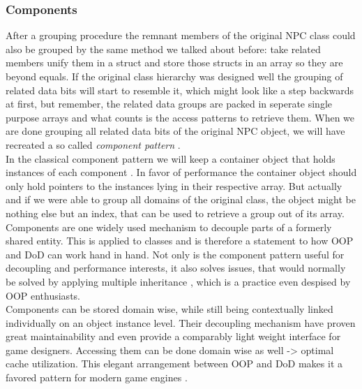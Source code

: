 \subsubsection{Components}
After a grouping procedure the remnant members of the original NPC class could also be grouped by the same method we talked about before: take related members unify them in a struct and store those structs in an array so they are beyond equals. If the original class hierarchy was designed well the grouping of related data bits will start to resemble it, which might look like a step backwards at first, but remember, the related data groups are packed in seperate single purpose arrays and what counts is the access patterns to retrieve them. When we are done grouping all related data bits of the original NPC object, we will have recreated a so called \textit{component pattern} .\\
In the classical component pattern we will keep a container object that holds instances of each component . In favor of performance the container object should only hold pointers to the instances lying in their respective array. But actually and if we were able to group all domains of the original class, the object might be nothing else but an index, that can be used to retrieve a group out of its array.\\
Components are one widely used mechanism to decouple parts of a formerly shared entity. This is applied to classes and is therefore a statement to how OOP and DoD can work hand in hand. Not only is the component pattern useful for decoupling and performance interests, it also solves issues, that would normally be solved by applying multiple inheritance , which is a practice even despised by OOP enthusiasts.\\
Components can be stored domain wise, while still being contextually linked individually on an object instance level. Their decoupling mechanism have proven great maintainability and even provide a comparably light weight interface for game designers. Accessing them can be done domain wise as well -> optimal cache utilization. This elegant arrangement between OOP and DoD makes it a favored pattern for modern game engines .

